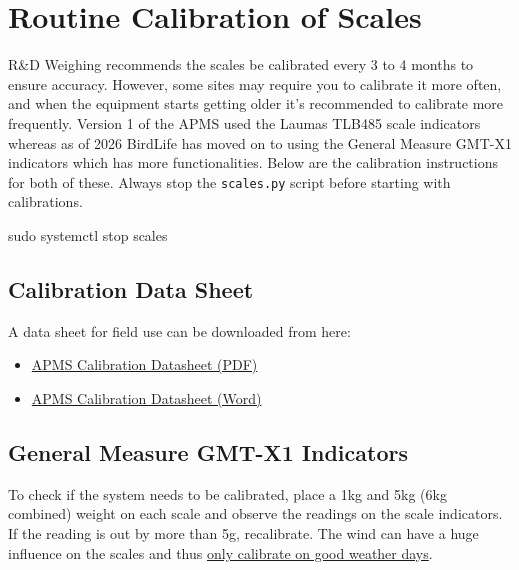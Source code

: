 \documentclass[
  letterpaper,
]{scrbook}
\newenvironment{Shaded}{\begin{snugshade}}{\end{snugshade}}
\newcommand{\FunctionTok}[1]{\textcolor[rgb]{0.28,0.35,0.67}{#1}}
\newcommand{\NormalTok}[1]{\textcolor[rgb]{0.00,0.23,0.31}{#1}}
\begin{document}
\section{Routine Calibration of
Scales}\label{routine-calibration-of-scales}

R\&D Weighing recommends the scales be calibrated every 3 to 4 months to
ensure accuracy. However, some sites may require you to calibrate it
more often, and when the equipment starts getting older it's recommended
to calibrate more frequently. Version 1 of the APMS used the Laumas
TLB485 scale indicators whereas as of 2026 BirdLife has moved on to
using the General Measure GMT-X1 indicators which has more
functionalities. Below are the calibration instructions for both of
these. Always stop the \texttt{scales.py} script before starting with
calibrations.

\begin{Shaded}
\begin{Highlighting}[]
\FunctionTok{sudo}\NormalTok{ systemctl stop scales}
\end{Highlighting}
\end{Shaded}

\subsection{Calibration Data Sheet}\label{calibration-data-sheet}

A data sheet for field use can be downloaded from here:

\begin{itemize}
\item
  \href{_book/files/APMS_Calibration_datasheet.pdf}{APMS Calibration
  Datasheet (PDF)}
\item
  \href{_book/files/APMS_Calibration_datasheet.docx}{APMS Calibration
  Datasheet (Word)}
\end{itemize}

\subsection{General Measure GMT-X1
Indicators}\label{general-measure-gmt-x1-indicators}

To check if the system needs to be calibrated, place a 1kg and 5kg (6kg
combined) weight on each scale and observe the readings on the scale
indicators. If the reading is out by more than 5g, recalibrate. The wind
can have a huge influence on the scales and thus \ul{only calibrate on
good weather days}.
\end{document}
